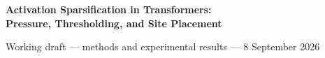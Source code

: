 \documentclass[10pt]{article}
\begin{document}
\begin{center}
{\large\bfseries Activation Sparsification in Transformers:\\
Pressure, Thresholding, and Site Placement}\par
\small Working draft --- methods and experimental results --- 8 September 2026
\end{center}




\clearpage
\begingroup
\small
\raggedright


\endgroup
\clearpage
\appendix


\end{document}
